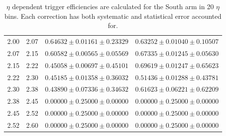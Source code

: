 \begin{table}
\begin{tabular}{cccc}
    2.00 & 2.07 & $0.64632 \pm 0.01161 \pm 0.23329$ & $0.63252 \pm 0.01040 \pm 0.10507$ \\
    2.07 & 2.15 & $0.60582 \pm 0.00565 \pm 0.05569$ & $0.67335 \pm 0.01245 \pm 0.05630$ \\
    2.15 & 2.22 & $0.45058 \pm 0.00697 \pm 0.45101$ & $0.69619 \pm 0.01247 \pm 0.65623$ \\
    2.22 & 2.30 & $0.45185 \pm 0.01358 \pm 0.36032$ & $0.51436 \pm 0.01288 \pm 0.43781$ \\
    2.30 & 2.38 & $0.43890 \pm 0.07336 \pm 0.34632$ & $0.61623 \pm 0.06221 \pm 0.62209$ \\
    2.38 & 2.45 & $0.00000 \pm 0.25000 \pm 0.00000$ & $0.00000 \pm 0.25000 \pm 0.00000$ \\
    2.45 & 2.52 & $0.00000 \pm 0.25000 \pm 0.00000$ & $0.00000 \pm 0.25000 \pm 0.00000$ \\
    2.52 & 2.60 & $0.00000 \pm 0.25000 \pm 0.00000$ & $0.00000 \pm 0.25000 \pm 0.00000$ \\
    \bottomrule
  \end{tabular}
  \caption{
    $\eta$ dependent trigger efficiencies are calculated for the South arm in 20
    $\eta$ bins. Each correction has both systematic and statistical error
    accounted for.
  }
  \label{tab:rapidity_corrections_south}
\end{table}

